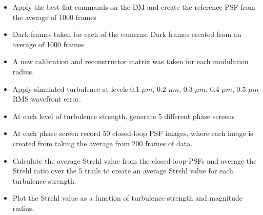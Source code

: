 \documentclass[12pt]{spieman}  %
\begin{document}
\begin{spacing}{2}
\begin{itemize}
    \item Apply the best flat commands on the DM and create the reference PSF from the average of 1000 frames
    \item Dark frames taken for each of the cameras. Dark frames created from an average of 1000 frames
    \item A new calibration and reconstructor matrix was taken for each modulation radius.
    \item Apply simulated turbulence at levels 0.1-$\mu m$, 0.2-$\mu m$, 0.3-$\mu m$, 0.4-$\mu m$, 0.5-$\mu m$ RMS wavefront error. 
    \item At each level of turbulence strength, generate 5 different phase screens
    \item At each phase screen record 50 closed-loop PSF images, where each image is created from taking the average from 200 frames of data. 
    \item Calculate the average Strehl value from the closed-loop PSFs and average the Strehl ratio over the 5 trails to create an average Strehl value for each turbulence strength.
    \item Plot the Strehl value as a function of turbulence strength and magnitude radius. 
    

    
\end{itemize}





	
 




 






\end{spacing}
\end{document}
